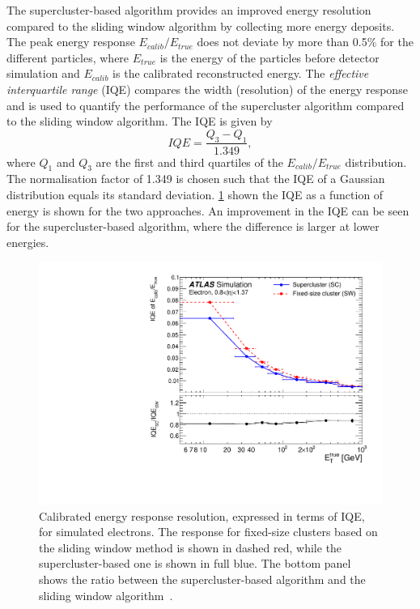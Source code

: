The supercluster-based algorithm provides an improved energy resolution compared to the sliding window algorithm by collecting more energy deposits. The peak energy response $E_{calib}/E_{true}$ does not deviate by more than 0.5\% for the different particles, where $E_{true}$ is the energy of the particles before detector simulation and $E_{calib}$ is the calibrated reconstructed energy. The \emph{effective interquartile range} (IQE) compares the width (resolution) of the energy response and is used to quantify the performance of the supercluster algorithm compared to the sliding window algorithm. The IQE is given by
\begin{equation}
    IQE = \frac{Q_3 - Q_1}{1.349},
\end{equation}
where $Q_1$ and $Q_3$ are the first and third quartiles of the $E_{calib}/E_{true}$ distribution. The normalisation factor of 1.349 is chosen such that the IQE of a Gaussian distribution equals its standard deviation. \cref{fig:method:iqe} shown the IQE as a function of energy is shown for the two approaches. An improvement in the IQE can be seen for the supercluster-based algorithm, where the difference is larger at lower energies. 
\begin{figure}[h]
    \centering
    \includegraphics[width=\mediumfigwidth]{images/IQE_reco_1.pdf}
    \caption[Calibrated energy response resolution, expressed in terms of IQE, for simulated electrons]{Calibrated energy response resolution, expressed in terms of IQE, for simulated electrons. The response for fixed-size clusters based on the sliding window method is shown in dashed red, while the supercluster-based one is shown in full blue. The bottom panel shows the ratio between the supercluster-based algorithm and the sliding window algorithm~\cite{Aad:2019tso}.}
    \label{fig:method:iqe}
\end{figure}

